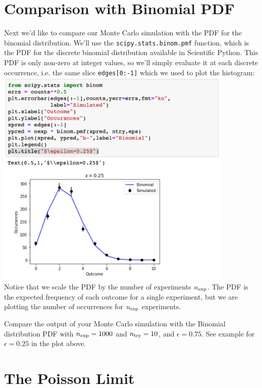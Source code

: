 \section{Comparison with Binomial PDF}

 Next we'd like to compare our Monte Carlo simulation with the PDF for
the binomial distribution.  We'll use the {\tt scipy.stats.binom.pmf}
function, which is the PDF for the discrete binomial distribution
available in Scientific Python.  This PDF is only non-zero at integer
values, so we'll simply evaluate it at each discrete occurrence,
i.e. the same slice {\tt edges[0:-1]} which we used to plot the
histogram:\\
\includegraphics[width=0.85\textwidth]{figs/labs/distributions/compare.png}
\\ Notice that we scale the PDF by the number of experiments $n_{\rm
  exp}$.  The PDF is the expected frequency of each outcome for a
single experiment, but we are plotting the number of occurrences for
$n_{\rm exp}$ experiments.

\begin{plot} Compare the output of your Monte Carlo simulation
with the Binomial distribution PDF with $n_{\rm exp} = 1000$ and
$n_{\rm try} = 10$, and $\epsilon = 0.75$. See example for $\epsilon = 0.25$ in the plot above.
\end{plot}


\section{The Poisson Limit}


